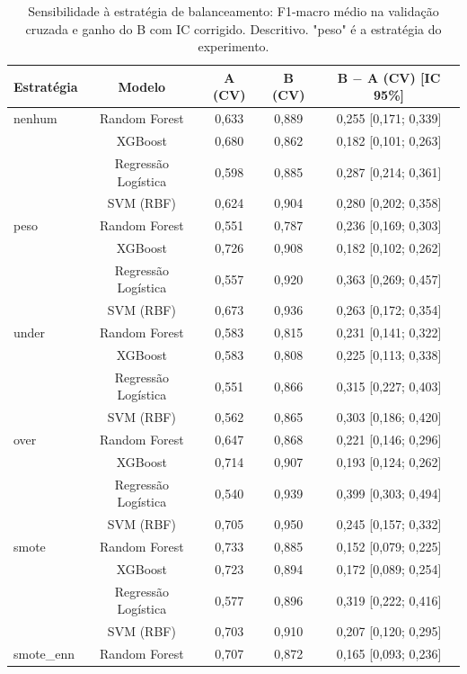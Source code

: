\begin{table}[htbp]
  \centering
  \caption{Sensibilidade à estratégia de balanceamento: F1-macro médio na validação cruzada e ganho do B com IC corrigido. Descritivo. "peso" é a estratégia do experimento.}
  \label{tab:sens_balanceamento}
  \begin{tabular}{lcccc}
    \toprule
    Estratégia & Modelo & A (CV) & B (CV) & B $-$ A (CV) [IC 95\%] \\
    \midrule
    nenhum & Random Forest & 0,633 & 0,889 & 0,255 [0,171; 0,339] \\
     & XGBoost & 0,680 & 0,862 & 0,182 [0,101; 0,263] \\
     & Regressão Logística & 0,598 & 0,885 & 0,287 [0,214; 0,361] \\
     & SVM (RBF) & 0,624 & 0,904 & 0,280 [0,202; 0,358] \\
    peso & Random Forest & 0,551 & 0,787 & 0,236 [0,169; 0,303] \\
     & XGBoost & 0,726 & 0,908 & 0,182 [0,102; 0,262] \\
     & Regressão Logística & 0,557 & 0,920 & 0,363 [0,269; 0,457] \\
     & SVM (RBF) & 0,673 & 0,936 & 0,263 [0,172; 0,354] \\
    under & Random Forest & 0,583 & 0,815 & 0,231 [0,141; 0,322] \\
     & XGBoost & 0,583 & 0,808 & 0,225 [0,113; 0,338] \\
     & Regressão Logística & 0,551 & 0,866 & 0,315 [0,227; 0,403] \\
     & SVM (RBF) & 0,562 & 0,865 & 0,303 [0,186; 0,420] \\
    over & Random Forest & 0,647 & 0,868 & 0,221 [0,146; 0,296] \\
     & XGBoost & 0,714 & 0,907 & 0,193 [0,124; 0,262] \\
     & Regressão Logística & 0,540 & 0,939 & 0,399 [0,303; 0,494] \\
     & SVM (RBF) & 0,705 & 0,950 & 0,245 [0,157; 0,332] \\
    smote & Random Forest & 0,733 & 0,885 & 0,152 [0,079; 0,225] \\
     & XGBoost & 0,723 & 0,894 & 0,172 [0,089; 0,254] \\
     & Regressão Logística & 0,577 & 0,896 & 0,319 [0,222; 0,416] \\
     & SVM (RBF) & 0,703 & 0,910 & 0,207 [0,120; 0,295] \\
    smote\_enn & Random Forest & 0,707 & 0,872 & 0,165 [0,093; 0,236] \\

\end{tabular}
\end{table}

